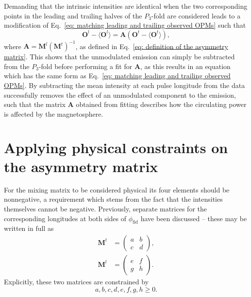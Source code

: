 Demanding that the intrinsic intensities are identical when the two corresponding points in the leading and trailing halves of the $P_3$-fold are considered leads to a modification of Eq.~\eqref{eq: matching leading and trailing observed OPMs} such that
\begin{equation}
    \label{eq: matching leading and trailing observed OPMs with background term}
    \mathbf{O}^l-\langle\mathbf{O}^l\rangle = \mathbf{A}(\mathbf{O}^t - \langle\mathbf{O}^t\rangle),
\end{equation}
where $\mathbf{A} = \mathbf{M}^l(\mathbf{M}^t)^{-1}$, as defined in Eq.~\eqref{eq: definition of the asymmetry matrix}. This shows that the unmodulated emission can simply be subtracted from the $P_3$-fold before performing a fit for $\mathbf{A}$, as this results in an equation which has the same form as Eq.~\eqref{eq: matching leading and trailing observed OPMs}. By subtracting the mean intensity at each pulse longitude from the data successfully removes the effect of an unmodulated component to the emission, such that the matrix $\mathbf{A}$ obtained from fitting describes how the circulating power is affected by the magnetosphere.














\section{Applying physical constraints on the asymmetry matrix}
\label{app: matrix maths - physical constraints}

For the mixing matrix to be considered physical its four elements should be nonnegative, a requirement which stems from the fact that the intensities themselves cannot be negative. Previously, separate matrices for the corresponding longitudes at both sides of $\phi_\mathrm{fid}$ have been discussed -- these may be written in full as
\begin{align}
    \mathbf{M}^t &= \begin{pmatrix} a&b\\c&d\end{pmatrix},\\
    \mathbf{M}^l &= \begin{pmatrix} e&f\\g&h\end{pmatrix}.
\end{align}
Explicitly, these two matrices are constrained by
\begin{equation}
    \label{eq: matrix maths - positive matrix elements}
    a,b,c,d,e,f,g,h \geq 0.
\end{equation}

